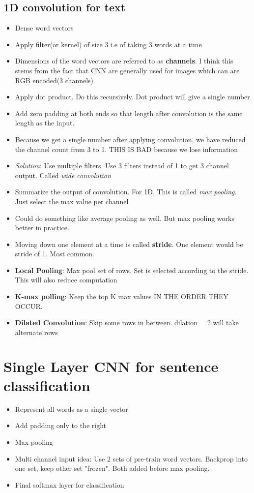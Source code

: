 \documentclass[a4paper]{article}
\begin{document}
\subsection{1D convolution for text}
\begin{itemize}
    \item Dense word vectors
    \item Apply filter(or kernel) of size 3 i.e of taking 3 words at a time
    \item Dimensions of the word vectors are referred to as \textbf{channels}. I think this stems from the fact that CNN are generally used for images which can are RGB encoded(3 channels) 
    \item Apply dot product. Do this recursively. Dot product will give a single number
    \item Add zero padding at both ends so that length after convolution is the same length as the input.
    \item Because we get a single number after applying convolution, we have reduced the channel count from 3 to 1. THIS IS BAD because we lose information
    \item \textit{Solution}: Use multiple filters. Use 3 filters instead of 1 to get 3 channel output. Called \textit{wide convolution} 
    \item Summarize the output of convolution. For 1D, This is called \textit{max pooling}. Just select the max value per channel
    \item Could do something like average pooling as well. But max pooling works better in practice.
    \item Moving down one element at a time is called \textbf{stride}. One element would be stride of 1. Most common. 
    \item \textbf{Local Pooling}: Max pool set of rows. Set is selected according to the stride. This will also reduce computation 
    \item \textbf{K-max polling}: Keep the top K max values IN THE ORDER THEY OCCUR. 
    \item \textbf{Dilated Convolution}: Skip some rows in between. dilation = 2 will take alternate rows 
\end{itemize}
\section{Single Layer CNN for sentence classification}
\begin{itemize}
    \item Represent all words as a single vector
    \item Add padding only to the right
    \item Max pooling
    \item Multi channel input idea: Use 2 sets of pre-train word vectors. Backprop into one set, keep other set "frozen". Both added before max pooling.
    \item Final softmax layer for classification
\end{itemize}
\end{document}
